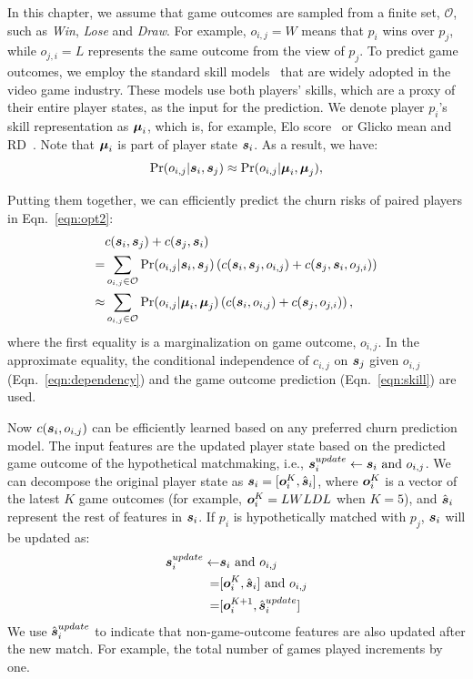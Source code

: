 In this chapter, we assume that game outcomes are sampled from a finite set, $\mathcal{O}$, such as \emph{Win}, \emph{Lose} and \emph{Draw}. For example, $o_{i,j}=W$ means that $p_i$ wins over $p_j$, while $o_{j,i}=L$ represents the same outcome from the view of $p_j$. To predict game outcomes, we employ the standard skill models~\cite{elo1978rating,glickman1999parameter} that are widely adopted in the video game industry. These models use both players' skills, which are a proxy of their entire player states, as the input for the prediction. We denote player $p_i$'s skill representation as $\boldsymbol{\mu}_i$, which is, for example, Elo score~\cite{elo1978rating} or Glicko mean and RD~\cite{glickman1999parameter}. Note that $\boldsymbol{\mu}_i$ is part of player state $\boldsymbol{s}_i$.  As a result, we have:
\begin{equation}\label{eqn:skill}
\Pr(o_{i,j}|\boldsymbol{s}_i, \boldsymbol{s}_j) \approx \Pr(o_{i,j}|\boldsymbol{\mu}_i, \boldsymbol{\mu}_j),
\end{equation}

Putting them together, we can efficiently predict the churn risks of paired players in Eqn.~\ref{eqn:opt2}:
\begin{align}
&c(\boldsymbol{s}_i, \boldsymbol{s}_j) + c(\boldsymbol{s}_j, \boldsymbol{s}_i) \label{eqn:c1} \\
=& \sum\limits_{o_{i,j} \in \mathcal{O}} \Pr(o_{i,j}|\boldsymbol{s}_i, \boldsymbol{s}_j)\left( c(\boldsymbol{s}_i, \boldsymbol{s}_j, o_{i,j}) + c(\boldsymbol{s}_j, \boldsymbol{s}_i, o_{j,i}) \right) \label{eqn:c2} \\
\approx & \sum\limits_{o_{i,j} \in \mathcal{O}} \Pr(o_{i,j}|\boldsymbol{\mu}_i, \boldsymbol{\mu}_j)\left( c(\boldsymbol{s}_i, o_{i,j}) + c(\boldsymbol{s}_j, o_{j,i}) \right), \label{eqn:c3}
\end{align}
where the first equality is a marginalization on game outcome, $o_{i,j}$. In the approximate equality, the conditional independence of $c_{i,j}$ on $\boldsymbol{s}_j$ given $o_{i,j}$ (Eqn.~\ref{eqn:dependency}) and the game outcome prediction (Eqn.~\ref{eqn:skill}) are used.

Now $c(\boldsymbol{s}_i, o_{i,j})$ can be efficiently learned based on any preferred churn prediction model. The input features are the updated player state based on the predicted game outcome of the hypothetical matchmaking, i.e., $\boldsymbol{s}_i^{update} \leftarrow \boldsymbol{s}_i \text{ and } o_{i,j}$. We can decompose the original player state as $\boldsymbol{s}_i = [\boldsymbol{o}_i^K, \hat{\boldsymbol{s}}_i]$, where $\boldsymbol{o}_i^K$ is a vector of the latest $K$ game outcomes (for example, $\boldsymbol{o}_i^K=LWLDL$ when $K=5$), and $\hat{\boldsymbol{s}}_i$ represent the rest of features in $\boldsymbol{s}_i$. If $p_i$ is hypothetically matched with $p_j$, $\boldsymbol{s}_i$ will be updated as:
\begin{align}\label{eqn:stateUpdate}
\boldsymbol{s}_i^{update} \leftarrow& \boldsymbol{s}_i \text{ and } o_{i,j} \\
                    =& [\boldsymbol{o}_i^K, \hat{\boldsymbol{s}}_i] \text{ and } o_{i,j} \\
                    =& [\boldsymbol{o}_i^{K+1}, \hat{\boldsymbol{s}}_i^{update}]
\end{align}
We use $\hat{\boldsymbol{s}}_i^{update}$ to indicate that non-game-outcome features are also updated after the new match. For example, the total number of games played increments by one. 


